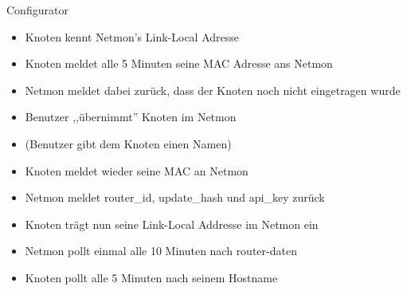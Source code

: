 \begin{frame}{Configurator}
    \begin{itemize}
        \item Knoten kennt Netmon's Link-Local Adresse
        \item Knoten meldet alle 5 Minuten seine MAC Adresse ans Netmon
        \item Netmon meldet dabei zurück, dass der Knoten noch nicht eingetragen wurde
        \item Benutzer ,,übernimmt'' Knoten im Netmon
        \item (Benutzer gibt dem Knoten einen Namen)
        \item Knoten meldet wieder seine MAC an Netmon
        \item Netmon meldet router\_id, update\_hash und api\_key zurück
        \item Knoten trägt nun seine Link-Local Addresse im Netmon ein
        \item Netmon pollt einmal alle 10 Minuten nach router-daten
        \item Knoten pollt alle 5 Minuten nach seinem Hostname
    \end{itemize}
\end{frame}
